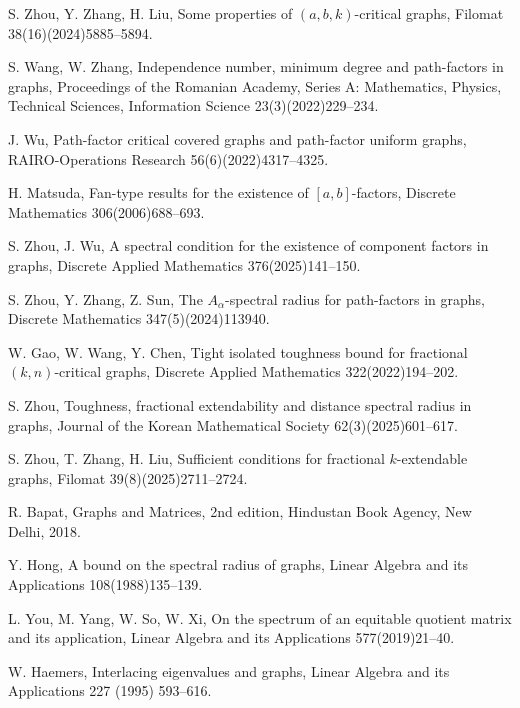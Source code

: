 \documentclass[10pt]{article}
\numberwithin{equation}{section}
\begin{document}
\begin{thebibliography}{9999}
 S. Zhou, Y. Zhang, H. Liu, Some properties of $(a,b,k)$-critical graphs, Filomat 38(16)(2024)5885--5894.

 S. Wang, W. Zhang, Independence number, minimum degree and path-factors in graphs, Proceedings of the Romanian Academy, Series A:
Mathematics, Physics, Technical Sciences, Information Science 23(3)(2022)229--234.

 J. Wu, Path-factor critical covered graphs and path-factor uniform graphs, RAIRO-Operations Research 56(6)(2022)4317--4325.

 H. Matsuda, Fan-type results for the existence of $[a,b]$-factors, Discrete Mathematics 306(2006)688--693.

 S. Zhou, J. Wu, A spectral condition for the existence of component factors in graphs, Discrete Applied Mathematics 376(2025)141--150.

 S. Zhou, Y. Zhang, Z. Sun, The $A_{\alpha}$-spectral radius for path-factors in graphs, Discrete Mathematics 347(5)(2024)113940.

 W. Gao, W. Wang, Y. Chen, Tight isolated toughness bound for fractional $(k,n)$-critical graphs, Discrete Applied Mathematics 322(2022)194--202.

 S. Zhou, Toughness, fractional extendability and distance spectral radius in graphs, Journal of the Korean Mathematical Society 62(3)(2025)601--617.

 S. Zhou, T. Zhang, H. Liu, Sufficient conditions for fractional $k$-extendable graphs, Filomat 39(8)(2025)2711--2724.

 R. Bapat, Graphs and Matrices, 2nd edition, Hindustan Book Agency, New Delhi, 2018.

 Y. Hong, A bound on the spectral radius of graphs, Linear Algebra and its Applications 108(1988)135--139.

 L. You, M. Yang, W. So, W. Xi, On the spectrum of an equitable quotient matrix and its application, Linear Algebra and its Applications
577(2019)21--40.

 W. Haemers, Interlacing eigenvalues and graphs, Linear Algebra and its Applications 227 (1995) 593--616.



\end{thebibliography}
\end{document}
